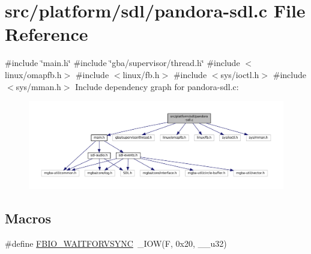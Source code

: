 \hypertarget{pandora-sdl_8c}{}\section{src/platform/sdl/pandora-\/sdl.c File Reference}
\label{pandora-sdl_8c}
{\ttfamily \#include \char`\"{}main.\+h\char`\"{}}\newline
{\ttfamily \#include \char`\"{}gba/supervisor/thread.\+h\char`\"{}}\newline
{\ttfamily \#include $<$linux/omapfb.\+h$>$}\newline
{\ttfamily \#include $<$linux/fb.\+h$>$}\newline
{\ttfamily \#include $<$sys/ioctl.\+h$>$}\newline
{\ttfamily \#include $<$sys/mman.\+h$>$}\newline
Include dependency graph for pandora-\/sdl.c\+:
\nopagebreak
\begin{figure}[H]
\begin{center}
\leavevmode
\includegraphics[width=350pt]{pandora-sdl_8c__incl}
\end{center}
\end{figure}
\subsection*{Macros}
\begin{DoxyCompactItemize}
\item 
\#define \mbox{\hyperlink{pandora-sdl_8c_ad169cbc3efb007545485b3ca1b5d7e6a}{F\+B\+I\+O\+\_\+\+W\+A\+I\+T\+F\+O\+R\+V\+S\+Y\+NC}}~\+\_\+\+I\+OW(\textquotesingle{}F\textquotesingle{}, 0x20, \+\_\+\+\_\+u32)
\end{DoxyCompactItemize}
